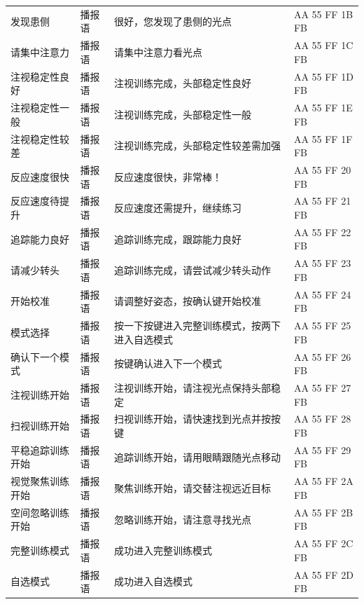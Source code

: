 \begin{longtable}{p{2.5cm} p{2.2cm} p{5.5cm} p{3.5cm}}
发现患侧   & 播报语   & 很好，您发现了患侧的光点         & AA 55 FF 1B FB  \\
请集中注意力   & 播报语   & 请集中注意力看光点               & AA 55 FF 1C FB  \\
注视稳定性良好   & 播报语   & 注视训练完成，头部稳定性良好     & AA 55 FF 1D FB  \\
注视稳定性一般   & 播报语   & 注视训练完成，头部稳定性一般     & AA 55 FF 1E FB  \\
注视稳定性较差   & 播报语   & 注视训练完成，头部稳定性较差需加强 & AA 55 FF 1F FB  \\
反应速度很快   & 播报语   & 反应速度很快，非常棒！           & AA 55 FF 20 FB  \\
反应速度待提升   & 播报语   & 反应速度还需提升，继续练习       & AA 55 FF 21 FB  \\
追踪能力良好   & 播报语   & 追踪训练完成，跟踪能力良好       & AA 55 FF 22 FB  \\
请减少转头   & 播报语   & 追踪训练完成，请尝试减少转头动作 & AA 55 FF 23 FB  \\
开始校准   & 播报语   & 请调整好姿态，按确认键开始校准   & AA 55 FF 24 FB  \\
模式选择   & 播报语   & 按一下按键进入完整训练模式，按两下进入自选模式 & AA 55 FF 25 FB  \\
确认下一个模式   & 播报语   & 按键确认进入下一个模式           & AA 55 FF 26 FB  \\
注视训练开始   & 播报语   & 注视训练开始，请注视光点保持头部稳定 & AA 55 FF 27 FB  \\
扫视训练开始   & 播报语   & 扫视训练开始，请快速找到光点并按按键 & AA 55 FF 28 FB  \\
平稳追踪训练开始 & 播报语 & 追踪训练开始，请用眼睛跟随光点移动 & AA 55 FF 29 FB  \\
视觉聚焦训练开始 & 播报语 & 聚焦训练开始，请交替注视远近目标 & AA 55 FF 2A FB  \\
空间忽略训练开始 & 播报语 & 忽略训练开始，请注意寻找光点     & AA 55 FF 2B FB  \\
完整训练模式   & 播报语   & 成功进入完整训练模式             & AA 55 FF 2C FB  \\
自选模式   & 播报语   & 成功进入自选模式                 & AA 55 FF 2D FB  \\
\end{longtable}
